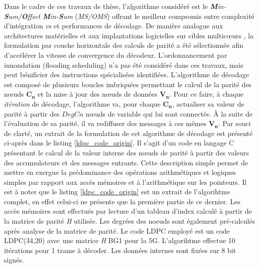 \documentclass[../main.tex]{subfiles}
\begin{document}
Dans le cadre de ces travaux de thèse, l'algorithme considéré est le \textit{\textbf{M}in-\textbf{S}um/\textbf{O}ffset \textbf{M}in-\textbf{S}um} (\textit{MS/OMS}) offrant le meilleur compromis entre complexité d'intégration \textit{vs} et performances de décodage. De manière analogue aux architectures matérielles \cite{LDPC:APPROX:3,LDPC:APPROX:4} et aux implantations logicielles sur cibles multicœurs \cite{BLG:REVUE:TPDS}, la formulation par couche horizontale des calculs de parité a été sélectionnée afin d'accélérer la vitesse de convergence du décodeur. L'ordonnancement par innondation (flooding scheduling) n'a pas été considéré dans ces travaux, mais peut bénificier des instructions spécialisées identifiées. 
L'algorithme de décodage est composé de plusieurs boucles imbriquées permettant le calcul de la parité des nœuds $\bm{C_n}$ et la mise à jour des nœuds de données $\bm{V_n}$. 
Pour ce faire, à chaque \textit{itération} de décodage, l'algorithme va, pour chaque $\bm{C_n}$, actualiser sa valeur de parité à partir des $DegCn$ nœuds de variable qui lui sont connectés. 
À la suite de l'évaluation de sa parité, il va rediffuser des messages à ces mêmes $\bm{V_n}$. Par souci de clarté, un extrait de la formulation de cet algorithme de décodage est présenté ci-après dans le listing \ref{ldpc_code_origin}. Il s'agit d'un code en langage C présentant le calcul de la valeur interne des nœuds de parité à partir des valeurs des accumulateurs et des messages entrants. Cette description simple permet de mettre en exergue la prédominance des opérations arithmétiques et logiques simples par rapport aux accès mémoires et à l'arithmétique sur les pointeurs.
Il est à noter que le listing \ref{ldpc_code_origin} est un extrait de l'algorihtme complet, en effet celui-ci ne présente que la première partie de ce dernier. Les accès mémoires sont effectués par lecture d'un tableau d'index calculé à partir de la matrice de parité \textit{H} utilisée. Les degrées des noeuds sont également pré-calculés après analyse de la matrice de parité. Le code LDPC employé est un code LDPC(34,20) avec une matrice \textit{H} BG1 pour la 5G. L'algorihtme effectue 10 itérations pour 1 trame à décoder. Les données internes sont fixées sur 8 bit signés. 
\end{document}
